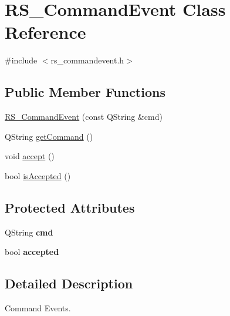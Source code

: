 \hypertarget{classRS__CommandEvent}{\section{R\-S\-\_\-\-Command\-Event Class Reference}
\label{classRS__CommandEvent}
}


{\ttfamily \#include $<$rs\-\_\-commandevent.\-h$>$}

\subsection*{Public Member Functions}
\begin{DoxyCompactItemize}
\item 
\hyperlink{classRS__CommandEvent_a309760c4dd4d7dbbf94d0f0ef2a1ca3c}{R\-S\-\_\-\-Command\-Event} (const Q\-String \&cmd)
\item 
Q\-String \hyperlink{classRS__CommandEvent_afa8ad6505cfbea279c98981f0f3c09f9}{get\-Command} ()
\item 
void \hyperlink{classRS__CommandEvent_a6d0a262a4aba7055d82a1bd391a1881c}{accept} ()
\item 
bool \hyperlink{classRS__CommandEvent_a0d7038b579a6751da25eb85a0931f283}{is\-Accepted} ()
\end{DoxyCompactItemize}
\subsection*{Protected Attributes}
\begin{DoxyCompactItemize}
\item 
\hypertarget{classRS__CommandEvent_ab6526df8c70589a61f4f3c52d073a887}{Q\-String {\bfseries cmd}}\label{classRS__CommandEvent_ab6526df8c70589a61f4f3c52d073a887}

\item 
\hypertarget{classRS__CommandEvent_a7d620d0cff3427b0f72a1c4b08959264}{bool {\bfseries accepted}}\label{classRS__CommandEvent_a7d620d0cff3427b0f72a1c4b08959264}

\end{DoxyCompactItemize}


\subsection{Detailed Description}
Command Events. 

